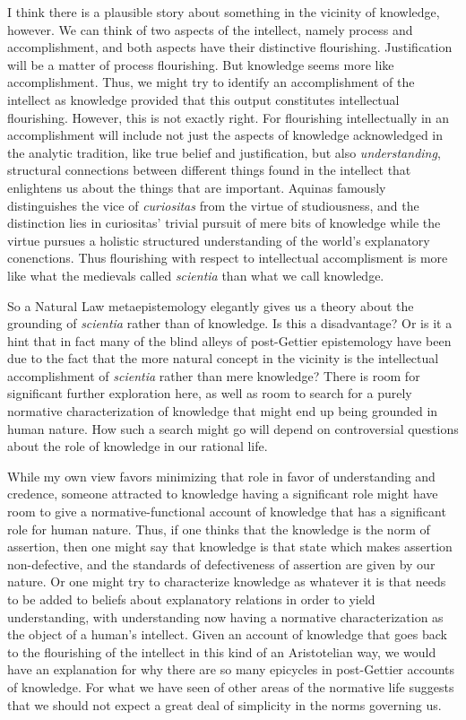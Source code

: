 I think there is a plausible story about something in the vicinity of knowledge, however. We can think of two aspects of the
intellect, namely process and accomplishment, and both aspects have their distinctive flourishing. Justification will be a matter of
process flourishing. But knowledge seems more like accomplishment. Thus, we might try to identify an accomplishment of the intellect as 
knowledge provided that this output constitutes intellectual flourishing. However, this is not exactly right. For flourishing
intellectually in an accomplishment will include not just the aspects of knowledge acknowledged in the analytic tradition, like true 
belief and justification, but also \textit{understanding}, structural connections between different things found in the intellect that
enlightens us about the things that are important. Aquinas famously distinguishes the vice of \textit{curiositas} from the virtue of
studiousness, and the distinction lies in curiositas' trivial pursuit of mere bits of knowledge while the virtue pursues a holistic
structured understanding of the world's explanatory conenctions. Thus flourishing with respect to intellectual accomplisment is more
like what the medievals called \textit{scientia} than what we call knowledge.

So a Natural Law metaepistemology elegantly gives us a theory about the grounding of \textit{scientia} rather than of knowledge. 
Is this a disadvantage? Or is it a hint that in fact many of the blind alleys of post-Gettier epistemology have been due to the
fact that the more natural concept in the vicinity is the intellectual accomplishment of \textit{scientia} rather than mere 
knowledge?  There is room for significant further exploration here, as well as room to search for a purely normative characterization
of knowledge that might end up being grounded in human nature. How such a search might go will depend on controversial questions about
the role of knowledge in our rational life. 

While my own view favors minimizing that role in favor of understanding and credence, 
someone attracted to knowledge having a significant role might have room to give a normative-functional account of knowledge that
has a significant role for human nature. Thus, if one thinks that the knowledge is the norm of assertion, then one might say that
knowledge is that state which makes assertion non-defective, and the standards of defectiveness of assertion are given by our nature.
Or one might try to characterize knowledge as whatever it is that needs to be added to beliefs about explanatory relations in order to yield
understanding, with understanding now having a normative characterization as the object of a human's intellect.
Given an account of knowledge that goes back to the flourishing of the intellect in this kind of an Aristotelian way, we would have
an explanation for why there are so many epicycles in post-Gettier accounts of knowledge. For what we have seen of other areas of the
normative life suggests that we should not expect a great deal of simplicity in the norms governing us. 

